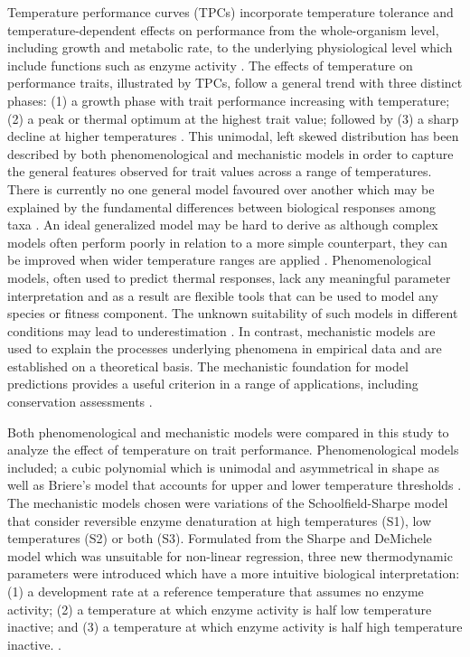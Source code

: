 \documentclass[11pt]{article}
\begin{document}
\begin{linenumbers}
 
Temperature performance curves (TPCs) incorporate temperature tolerance and temperature-dependent effects on performance from the whole-organism level, including growth and metabolic rate, to the underlying physiological level which include functions such as enzyme activity \cite{10.1093/icb/icr097}\cite{doi:10.1890/12-2060.1}. The effects of temperature on performance traits, illustrated by TPCs, follow a general trend
with three distinct phases: (1) a growth phase with trait performance increasing with temperature; (2) a peak or thermal optimum at the highest trait value; followed by (3) a sharp decline at higher temperatures \cite{Schulte2015}. This unimodal, left skewed distribution has been described by both phenomenological and mechanistic models in order to capture the general features observed for trait values across a range of temperatures. There is currently no one general model favoured over another which may be explained by the fundamental differences between biological responses among taxa \cite{pub.1026914980}\cite{doi:10.1002/ece3.3576}. An ideal generalized model may be hard to derive as although complex models often perform poorly in relation to a more simple counterpart, they can be improved when wider temperature ranges are applied \cite{Quinn2017ACR}. Phenomenological models, often used to predict thermal responses, lack any meaningful parameter interpretation and as a result are flexible tools that can be used to model any species or fitness component. The unknown suitability of such models in different conditions may lead to underestimation \cite{Martin2017PhenomenologicalVB}. In contrast, mechanistic models are used to explain the processes underlying phenomena in empirical data and are established on a theoretical basis. The mechanistic foundation for model predictions provides a useful criterion in a range of applications, including conservation assessments \cite{doi:10.1098/rsbl.2005.0417}. 

Both phenomenological and mechanistic models were compared in this study to analyze the effect of temperature on trait performance. Phenomenological models included; a cubic polynomial which is unimodal and asymmetrical in shape as well as Briere's model that accounts for upper and lower temperature thresholds \cite{10.1093/ee/28.1.22}. The mechanistic models chosen were variations of the Schoolfield-Sharpe model that consider  reversible enzyme denaturation at high temperatures (S1), low temperatures (S2) or both (S3).
Formulated from the Sharpe and DeMichele model which was unsuitable for non-linear regression, three new thermodynamic parameters were introduced which have a more intuitive biological interpretation: (1) a development rate at a reference temperature that assumes no enzyme activity; (2) a temperature at which enzyme activity is half low temperature inactive; and (3) a temperature at which enzyme activity is half high temperature inactive. \cite{Schoolfield1981}.


\end{linenumbers}
\end{document}

